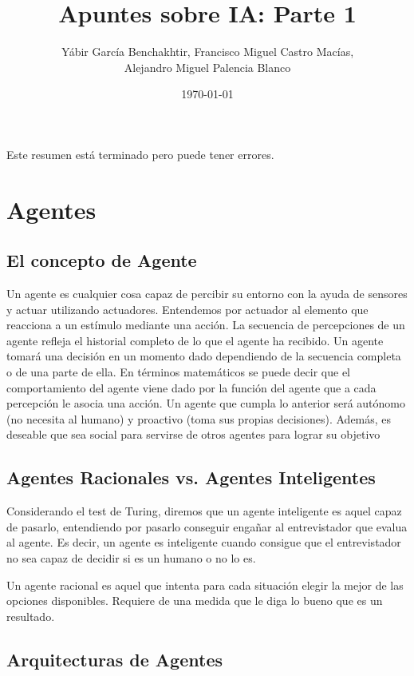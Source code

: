 \documentclass[12pt]{article}
\author{Yábir García Benchakhtir, Francisco Miguel Castro Macías, \\ Alejandro Miguel Palencia Blanco}
\date{\today}
\title{Apuntes sobre IA: Parte 1}
\begin{document}
\setlength{\parindent}{0cm}
\setlength{\parskip}{3mm}

\maketitle

Este resumen está terminado pero puede tener errores.

\section{Agentes}

\subsection{El concepto de Agente}

Un agente es cualquier cosa capaz de percibir su entorno con la ayuda
de sensores y actuar utilizando actuadores. Entendemos por actuador al
elemento que reacciona a un estímulo mediante una acción.  La
secuencia de percepciones de un agente refleja el historial completo
de lo que el agente ha recibido. Un agente tomará una decisión en un
momento dado dependiendo de la secuencia completa o de una parte de
ella. En términos matemáticos se puede decir que el comportamiento del
agente viene dado por la función del agente que a cada percepción le
asocia una acción.  Un agente que cumpla lo anterior será autónomo (no
necesita al humano) y proactivo (toma sus propias decisiones). Además,
es deseable que sea social para servirse de otros agentes para lograr
su objetivo

\subsection{Agentes Racionales vs. Agentes Inteligentes}

Considerando el test de Turing, diremos que un agente inteligente es
aquel capaz de pasarlo, entendiendo por pasarlo conseguir engañar al
entrevistador que evalua al agente. Es decir, un agente es inteligente
cuando consigue que el entrevistador no sea capaz de decidir si es un
humano o no lo es.

Un agente racional es aquel que intenta para cada situación elegir la
mejor de las opciones disponibles. Requiere de una medida que le diga
lo bueno que es un resultado.

\subsection{Arquitecturas de Agentes}
\end{document}
